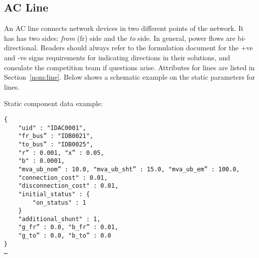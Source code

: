\subsection{AC Line}
\label{sec:acline}
An AC line connects network devices in two different points of the network. 
It has has two sides: \emph{from} (fr) side and the \emph{to} side.
In general, power flows are bi-directional. 
Readers should always refer to the formulation document for the +ve and -ve signs
requirements for indicating directions in their solutions,
and consulate the competition team if questions arise.
Attributes for lines are listed in Section~\ref{nom:line}.
Below shows a schematic example on the static parameters for lines.

Static component data example:
\begin{verbatim}
{
    "uid" : "IDAC0001",
    "fr_bus” : "IDB0021",
    "to_bus” : "IDB0025",
    "r” : 0.001, "x” : 0.05, 
    "b" : 0.0001,
    "mva_ub_nom” : 10.0, "mva_ub_sht” : 15.0, "mva_ub_em” : 100.0,    
    "connection_cost" : 0.01,
    "disconnection_cost" : 0.01,
    "initial_status" : {
        "on_status" : 1
    }
    "additional_shunt" : 1,
    "g_fr” : 0.0, "b_fr” : 0.01,
    "g_to” : 0.0, "b_to” : 0.0    
}
…     
\end{verbatim}


